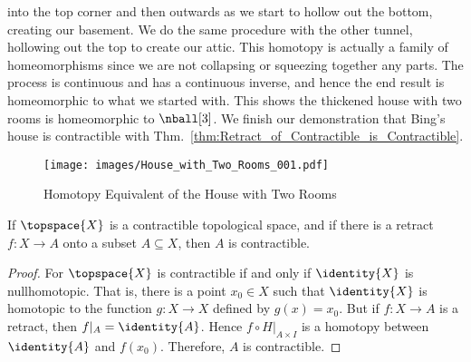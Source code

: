         into the top corner and then outwards as we start to hollow out
        the bottom, creating our basement. We do the same procedure with
        the other tunnel, hollowing out the top to create our attic.
        This homotopy is actually a family of homeomorphisms since we
        are not collapsing or squeezing together any parts. The process
        is continuous and has a continuous inverse, and hence the end
        result is homeomorphic to what we started with. This shows the
        thickened house with two rooms is homeomorphic to $\nball[3]$.
        We finish our demonstration that Bing's house is contractible
        with Thm.~\ref{thm:Retract_of_Contractible_is_Contractible}.
        \begin{figure}
            \centering
            \captionsetup{type=figure}
            \texttt{[image: images/House\_with\_Two\_Rooms\_001.pdf]}
            \caption{Homotopy Equivalent of the House with Two Rooms}
            \label{fig:House_with_Two_Rooms_001}
        \end{figure}
        \begin{theorem}
            \label{thm:Retract_of_Contractible_is_Contractible}%
            If $\topspace{X}$ is a contractible topological space, and
            if there is a retract $f:X\rightarrow{A}$ onto a subset
            $A\subseteq{X}$, then $A$ is contractible.
        \end{theorem}
        \begin{proof}
            For $\topspace{X}$ is contractible if and only if
            $\identity{X}$ is nullhomotopic. That is, there is a point
            $x_{0}\in{X}$ such that $\identity{X}$ is homotopic to the
            function $g:X\rightarrow{X}$ defined by $g(x)=x_{0}$. But if
            $f:X\rightarrow{A}$ is a retract, then
            $f|_{A}=\identity{A}$. Hence $f\circ{H}|_{A\times{I}}$ is a
            homotopy between $\identity{A}$ and $f(x_{0})$. Therefore,
            $A$ is contractible.
        \end{proof}
